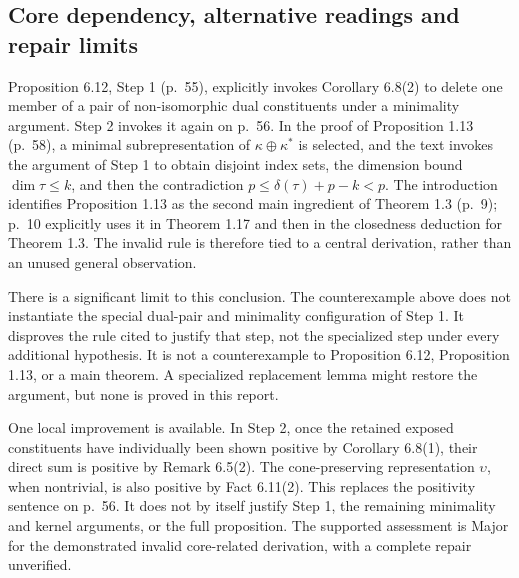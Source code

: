 \documentclass[10pt]{article}
\begin{document}
\subsection*{Core dependency, alternative readings and repair limits}
Proposition 6.12, Step 1 (p. 55), explicitly invokes Corollary 6.8(2) to delete one member of a pair of non-isomorphic dual constituents under a minimality argument. Step 2 invokes it again on p. 56. In the proof of Proposition 1.13 (p. 58), a minimal subrepresentation of \(\kappa\oplus\kappa^*\) is selected, and the text invokes the argument of Step 1 to obtain disjoint index sets, the dimension bound \(\dim\tau\leq k\), and then the contradiction \(p\leq\delta(\tau)+p-k<p\). The introduction identifies Proposition 1.13 as the second main ingredient of Theorem 1.3 (p. 9); p. 10 explicitly uses it in Theorem 1.17 and then in the closedness deduction for Theorem 1.3. The invalid rule is therefore tied to a central derivation, rather than an unused general observation.\par
There is a significant limit to this conclusion. The counterexample above does not instantiate the special dual-pair and minimality configuration of Step 1. It disproves the rule cited to justify that step, not the specialized step under every additional hypothesis. It is not a counterexample to Proposition 6.12, Proposition 1.13, or a main theorem. A specialized replacement lemma might restore the argument, but none is proved in this report.\par
One local improvement is available. In Step 2, once the retained exposed constituents have individually been shown positive by Corollary 6.8(1), their direct sum is positive by Remark 6.5(2). The cone-preserving representation \(\upsilon\), when nontrivial, is also positive by Fact 6.11(2). This replaces the positivity sentence on p. 56. It does not by itself justify Step 1, the remaining minimality and kernel arguments, or the full proposition. The supported assessment is Major for the demonstrated invalid core-related derivation, with a complete repair unverified.\par
\end{document}
